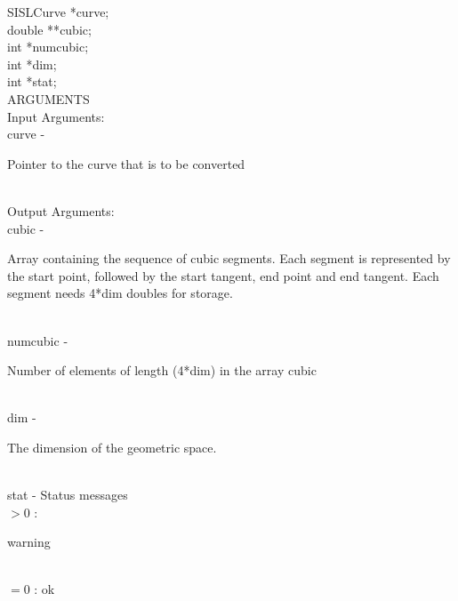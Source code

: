                 \>\>    SISLCurve       \>      *{\fov curve};\\
                \>\>    double  \>      **{\fov cubic};\\
                \>\>    int     \>      *{\fov numcubic};\\
                \>\>    int     \>      *{\fov dim};\\
                \>\>    int     \>      *{\fov stat};\\
ARGUMENTS\\
        \>Input Arguments:\\
        \>\>    {\fov curve}    \> - \> \begin{minipg2}
                                Pointer to the curve that is to be converted
                                \end{minipg2}\\[0.8ex]
        \>Output Arguments:\\
        \>\>    {\fov cubic}    \> - \> \begin{minipg2}
                                Array containing the sequence of cubic segments.
                                Each segment is represented by the start point,
                                followed by the start tangent, end point and end
                                tangent. Each segment needs 4*dim doubles for storage.
                                \end{minipg2}\\[0.3ex]
        \>\>    {\fov numcubic}\> - \>  \begin{minipg2}
                                Number of elements of length
                                (4*dim) in the array cubic
                                \end{minipg2}\\[0.8ex]
        \>\>    {\fov dim}      \> - \> \begin{minipg2}
                                The dimension of the geometric space.
                                \end{minipg2}\\
        \>\>    {\fov stat}     \> - \> Status messages\\
                \>\>\>\>\>      $> 0$   :\>\begin{minipg5}
                                                warning
                                        \end{minipg5}\\
                \>\>\>\>\>      $= 0$   :\> ok\\
